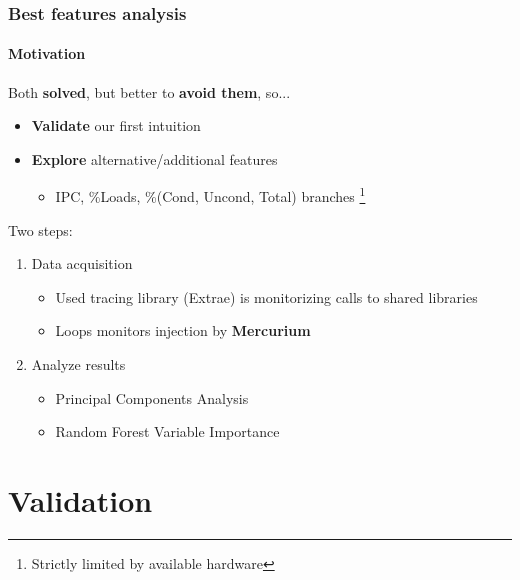 \documentclass{beamer}
\begin{document}
\begin{frame}
\frametitle{Best features analysis}
\framesubtitle{Motivation}
Both \textbf{solved}, but better to \textbf{avoid them}, so...
\begin{itemize}
	\item \textbf{Validate} our first intuition
	\item \textbf{Explore} alternative/additional features
	\begin{itemize}
		\item IPC, \%Loads, \%(Cond, Uncond, Total) branches \footnote{Strictly limited by available hardware}
	\end{itemize}
\end{itemize}
\pause
\vfill
Two steps:
\begin{enumerate}
	\item Data acquisition
	\begin{itemize}
		\item Used tracing library (Extrae) is monitorizing calls to shared libraries
		\item Loops monitors injection by \textbf{Mercurium}
	\end{itemize}
	\item Analyze results
	\begin{itemize}
		\item Principal Components Analysis
		\item Random Forest Variable Importance
	\end{itemize}
\end{enumerate}
\end{frame}


\section{Validation}
\end{document}

